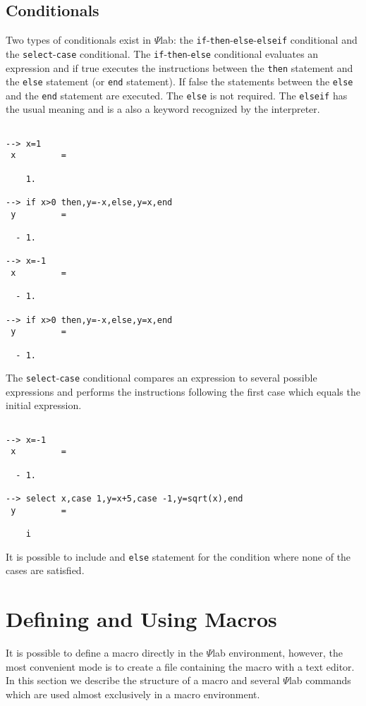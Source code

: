 \subsection{Conditionals}
Two types of conditionals exist in $\Psi$lab: the 
{\tt if}-{\tt then}-{\tt else}-{\tt elseif}
conditional and the 
{\tt select}-{\tt case} 
conditional.  The 
{\tt if}-{\tt then}-{\tt else} conditional
evaluates an expression and if true executes the
instructions between the {\tt then} statement and the {\tt else} statement
(or {\tt end} statement).
If false the statements between the {\tt else} and the {\tt end}
statement are executed.  The {\tt else} is not required. The {\tt elseif}
has the usual meaning and is a also a keyword recognized by the interpreter.
\begin{verbatim}
 
--> x=1
 x         =
 
    1.  
 
--> if x>0 then,y=-x,else,y=x,end
 y         =
 
  - 1.  
 
--> x=-1
 x         =
 
  - 1.  
 
--> if x>0 then,y=-x,else,y=x,end
 y         =
 
  - 1.  
\end{verbatim}


	The {\tt select}-{\tt case} conditional
compares an expression to several possible expressions and performs the
instructions following the first case which equals the initial expression.
\begin{verbatim}
 
--> x=-1
 x         =
 
  - 1.  
 
--> select x,case 1,y=x+5,case -1,y=sqrt(x),end
 y         =
 
    i    
\end{verbatim}
It is possible to include and {\tt else} statement for the condition
where none of the cases are satisfied.

\section{Defining and Using Macros}
\label{s4.2}

	It is possible to define a macro directly in
the $\Psi$lab environment, however, the most convenient mode
is to create a file containing the macro
with a text editor.  In this section we describe the
structure of a macro and several $\Psi$lab commands which are
used almost exclusively in a macro environment.

